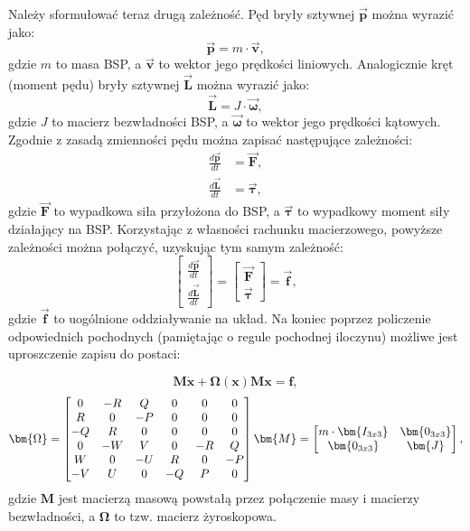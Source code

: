 Należy sformułować teraz drugą zależność. Pęd bryły sztywnej $\bm{\vec{p}}$ można wyrazić jako:
\[
	\bm{\vec{p}} = m \cdot \bm{\vec{v}},
\]
gdzie $m$ to masa BSP, a $\bm{\vec{v}}$ to wektor jego prędkości liniowych.
Analogicznie kręt (moment pędu) bryły sztywnej $\bm{\vec{L}}$ można wyrazić jako:
\[
	\bm{\vec{L}} = J \cdot \bm{\vec{\omega}},
\]
gdzie $J$ to macierz bezwładności BSP, a $\bm{\vec{\omega}}$ to wektor jego prędkości kątowych. Zgodnie z zasadą zmienności pędu można zapisać następujące zależności:
\[
	\begin{aligned}
	\frac{d\bm{\vec{p}}}{dt} & = \bm{\vec{F}},\\
	\frac{d\bm{\vec{L}}}{dt} & = \bm{\vec{\tau}},
	\end{aligned}
\]
gdzie $\bm{\vec{F}}$ to wypadkowa siła przyłożona do BSP, a $\bm{\vec{\tau}}$ to wypadkowy moment siły działający na BSP. Korzystając z własności rachunku macierzowego, powyższe zależności można połączyć, uzyskując tym samym zależność:
\[
              \begin{bmatrix}\frac{d\bm{\vec{p}}}{dt}\\ \frac{d\bm{\vec{L}}}{dt} \end{bmatrix} = \begin{bmatrix}\bm{\vec{F}}\\ \bm{\vec{\tau}} \end{bmatrix} = \bm{\vec{f}},
\]
gdzie $\bm{\vec{f}}$ to uogólnione oddziaływanie na układ. Na koniec poprzez policzenie odpowiednich pochodnych (pamiętając o regule pochodnej iloczynu) możliwe jest uproszczenie zapisu do postaci:

\[
	\bm{M} \bm{\dot{x}} +  \bm{\Omega} \left( \bm{x} \right) \bm{M} \bm{x} = \bm{f},
\]
\[
	\bm{\Omega} = \begin{bmatrix}
	0 & -R & Q & 0 & 0 & 0 \\
	R & 0 & -P & 0 & 0 & 0 \\
	-Q & R & 0 & 0 & 0 & 0 \\
	0 & -W & V & 0 & -R & Q \\
	W & 0 & -U & R & 0 & -P \\
	-V & U & 0 & -Q & P & 0 
	\end{bmatrix}
	\vspace{10pt}
	\bm{M} = \begin{bmatrix}
	m\cdot \bm{ I_{3x3}} & \bm{0_{3x3}} \\ \bm{0_{3x3}} & \bm{J}
	\end{bmatrix},
\]
gdzie $\bm{M}$ jest macierzą masową powstałą przez połączenie masy i macierzy bezwładności, a $\bm{\Omega}$ to tzw. macierz żyroskopowa.\\

